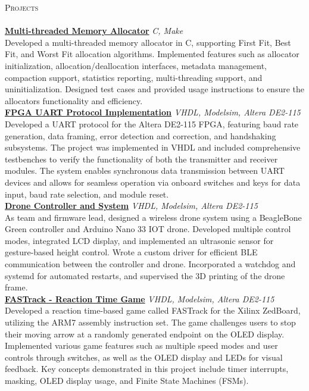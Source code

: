 \documentclass[a4paper]{article}
\newcommand{\lineunder} {
    \vspace*{-8pt} \\
    \hspace*{-18pt} \hrulefill \\
}
\newcommand{\header} [1] {
    {\hspace*{-18pt}\vspace*{6pt} \textsc{#1}}
    \vspace*{-6pt} \lineunder
}
\begin{document}
\header{Projects}
\href{https://github.com/SatireSage/Multi-threaded-Memory-Allocator}{\textbf{Multi-threaded Memory Allocator}} {\sl C, Make} \hfill\\
Developed a multi-threaded memory allocator in C, supporting First Fit, Best Fit, and Worst Fit allocation algorithms. Implemented features such as allocator initialization, allocation/deallocation interfaces, metadata management, compaction support, statistics reporting, multi-threading support, and uninitialization. Designed test cases and provided usage instructions to ensure the allocator\textquotesingle{}s functionality and efficiency.\\
\vspace*{2mm}
\href{https://github.com/SatireSage/FPGA-UART-Protocol}{\textbf{FPGA UART Protocol Implementation}} {\sl VHDL, Modelsim, Altera DE2-115} \hfill\\
Developed a UART protocol for the Altera DE2-115 FPGA, featuring baud rate generation, data framing, error detection and correction, and handshaking subsystems. The project was implemented in VHDL and included comprehensive testbenches to verify the functionality of both the transmitter and receiver modules. The system enables synchronous data transmission between UART devices and allows for seamless operation via onboard switches and keys for data input, baud rate selection, and module reset.\\
\vspace*{2mm}
\href{https://github.com/SatireSage/Dronee}{\textbf{Drone Controller and System}} {\sl VHDL, Modelsim, Altera DE2-115} \hfill\\
As team and firmware lead, designed a wireless drone system using a BeagleBone Green controller and Arduino Nano 33 IOT drone. Developed multiple control modes, integrated LCD display, and implemented an ultrasonic sensor for gesture-based height control. Wrote a custom driver for efficient BLE communication between the controller and drone. Incorporated a watchdog and systemd for automated restarts, and supervised the 3D printing of the drone frame.\\
\vspace*{2mm}
\href{https://github.com/SatireSage/FASTrack}{\textbf{FASTrack - Reaction Time Game}} {\sl VHDL, Modelsim, Altera DE2-115} \hfill\\
Developed a reaction time-based game called FASTrack for the Xilinx ZedBoard, utilizing the ARM7 assembly instruction set. The game challenges users to stop their moving arrow at a randomly generated endpoint on the OLED display. Implemented various game features such as multiple speed modes and user controls through switches, as well as the OLED display and LEDs for visual feedback. Key concepts demonstrated in this project include timer interrupts, masking, OLED display usage, and Finite State Machines (FSMs).\\
\vspace*{2mm}
\end{document}
